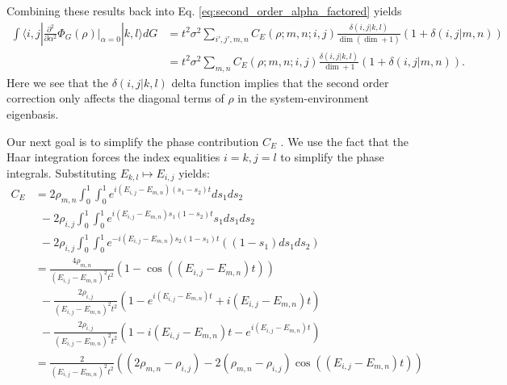 \documentclass{article}
\newcommand{\ket}[1]{|#1\rangle}
\newcommand{\bra}[1]{\langle #1|}
\newcommand{\parens}[1]{\left( #1 \right)}
\begin{document}
Combining these results back into Eq. \eqref{eq:second_order_alpha_factored} yields
\begin{align}
    \int \bra{i,j} \frac{\partial^2}{\partial \alpha^2} \Phi_G(\rho) \bigg|_{\alpha = 0} \ket{k,l} dG &= t^2 \sigma^2 \sum_{i',j',m,n} C_E(\rho; m,n; i,j) \frac{\delta(i, j | k,l)}{\dim (\dim + 1)} (1 + \delta(i,j | m,n)) \\
    &= t^2 \sigma^2 \sum_{m,n} C_E(\rho; m,n; i,j) \frac{\delta(i, j | k,l)}{\dim + 1
    } (1 + \delta(i,j | m,n)).
\end{align}
Here we see that the $\delta(i,j | k,l)$ delta function implies that the second order correction only affects the diagonal terms of $\rho$ in the system-environment eigenbasis.

Our next goal is to simplify the phase contribution $C_E$ . We use the fact that the Haar integration forces the index equalities $i = k, j = l$ to simplify the phase integrals. Substituting $E_{k,l} \mapsto E_{i,j}$ yields:
\begin{align}
    C_E &= 2 \rho_{m,n} \int_0^1 \int_0^1 e^{i(E_{i,j} - E_{m,n})(s_1 - s_2)t} ds_1 ds_2 \nonumber \\
    &~ ~ - 2 \rho_{i,j} \int_0^1 \int_0^1 e^{i (E_{i,j} - E_{m,n})s_1 (1- s_2)t}s_1 ds_1 ds_2 \nonumber \\
    &~ ~ - 2 \rho_{i,j} \int_0^1 \int_0^1 e^{-i(E_{i,j} - E_{m,n})s_2(1-s_1)t}((1-s_1)ds_1 ds_2) \label{eq:phase_int_equal_energy} \\
    &= \frac{4 \rho_{m,n}}{(E_{i,j} - E_{m,n})^2 t^2} (1 - \cos((E_{i,j} - E_{m,n})t)) \nonumber \\
    &~ ~ - \frac{2 \rho_{i,j}}{(E_{i,j} - E_{m,n})^2 t^2} \parens{1 - e^{i (E_{i,j} - E_{m,n})t} + i (E_{i,j} - E_{m,n})t } \nonumber \\
    & ~ ~ - \frac{2 \rho_{i,j}}{(E_{i,j} - E_{m,n})^2 t^2} \parens{1 - i (E_{i,j} - E_{m,n})t - e^{i(E_{i,j} - E_{m,n})t}} \\
    &= \frac{2}{(E_{i,j} - E_{m,n})^2 t^2} \parens{(2 \rho_{m,n} - \rho_{i,j}) - 2(\rho_{m,n} - \rho_{i,j}) \cos ((E_{i,j} - E_{m,n})t)}
\end{align}
\end{document}
